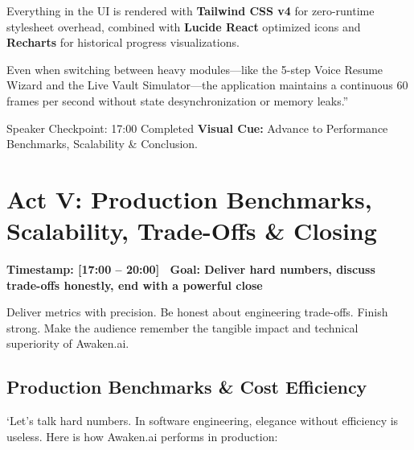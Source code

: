 \documentclass[11pt,a4paper]{article}
\begin{document}
Everything in the UI is rendered with \textbf{Tailwind CSS v4} for zero-runtime stylesheet overhead, combined with \textbf{Lucide React} optimized icons and \textbf{Recharts} for historical progress visualizations. 

Even when switching between heavy modules---like the 5-step Voice Resume Wizard and the Live Vault Simulator---the application maintains a continuous 60 frames per second without state desynchronization or memory leaks.''

\begin{timingbox}{Speaker Checkpoint: 17:00 Completed}
\textbf{Visual Cue:} Advance to Performance Benchmarks, Scalability \& Conclusion.
\end{timingbox}

\newpage

\section{Act V: Production Benchmarks, Scalability, Trade-Offs \& Closing}
\textcolor{accentyellow}{\textbf{Timestamp: [17:00 -- 20:00] \textbar\ Goal: Deliver hard numbers, discuss trade-offs honestly, end with a powerful close}}

\begin{speakercue}{Deliver metrics with precision. Be honest about engineering trade-offs. Finish strong.}
Make the audience remember the tangible impact and technical superiority of Awaken.ai.
\end{speakercue}

\subsection{Production Benchmarks \& Cost Efficiency}
`Let's talk hard numbers. In software engineering, elegance without efficiency is useless. Here is how Awaken.ai performs in production:
\end{document}
